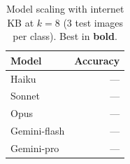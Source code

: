 \begin{table}[t]
\centering
\small
\caption{Model scaling with internet KB at $k=8$ (3 test images per class). Best in \textbf{bold}.}
\label{tab:wheat_model_ablation}
\begin{tabular}{lr}
\toprule
Model & Accuracy \\
\midrule
Haiku & — \\
Sonnet & — \\
Opus & — \\
Gemini-flash & — \\
Gemini-pro & — \\
\bottomrule
\end{tabular}
\end{table}